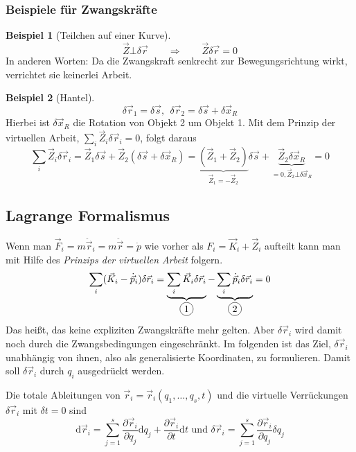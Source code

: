 \documentclass[oneside]{book}
\theoremstyle{definition}
\newtheorem*{beispiel*}{Beispiel}
\newcommand{\circled}[1]{\tikz[baseline=(char.base)]{
		\node[shape=circle,draw,inner sep=2pt] (char) {#1};}}
\renewcommand{\d}{\mathrm d}
\newcommand{\ddv}[1]{\ddot{\vec{#1}}}
\newcommand{\ddotvec}[1]{\ddot{\vec{#1}}}
\begin{document}
\subsubsection{Beispiele für Zwangskräfte}

\begin{beispiel*}[Teilchen auf einer Kurve]
$$\vec{Z} \bot \delta \vec{r} \qquad \Rightarrow \qquad \vec{Z} \delta \vec{r} = 0$$
In anderen Worten: Da die Zwangskraft senkrecht zur Bewegungsrichtung wirkt, verrichtet sie keinerlei Arbeit. 
\end{beispiel*}

\begin{beispiel*}[Hantel]
$$\delta \vec{r}_1 = \delta\vec{s},~~ \delta \vec{r}_2 = \delta \vec{s} + \delta \vec{x}_R$$
Hierbei ist $\delta \vec{x}_R$ die Rotation von Objekt 2 um Objekt 1.
Mit dem Prinzip der virtuellen Arbeit, $\sum_i \vec{Z}_i \delta \vec{r}_i = 0$, folgt daraus
$$\sum_i \vec Z_i \delta \vec{r}_i = \vec{Z}_1 \delta \vec{s} + \vec{Z}_2 (\delta \vec{s} + \delta \vec{x}_R) 
= \underbrace{(\vec{Z}_1 + \vec{Z}_2)}_{\vec{Z}_1 = - \vec{Z}_2} \delta \vec{s} + \underbrace{\vec{Z}_2 \delta \vec{x}_R}_{= 0, \vec{Z}_2 \bot \delta \vec{x}_R} = 0$$
\end{beispiel*}

\subsection{Lagrange Formalismus}
Wenn man $\vec{F}_i = m \ddotvec{r}_i = m \ddv{r} = \dot p$ wie vorher als $F_i = \vec{K}_i + \vec{Z}_i$ aufteilt kann man mit Hilfe des \textit{Prinzips der virtuellen Arbeit} folgern.
$$\sum_i (\vec{K}_i - \dot{\vec{p}}_i) \delta \vec{r}_i = \underbrace{\sum_i \vec{K}_i \delta\vec{r}_i}_{\circled{1}} - \underbrace{\sum_i \dot{\vec{p}}_i \delta\vec{r}_i}_{\circled{2}} = 0$$
Das heißt, das keine expliziten Zwangskräfte mehr gelten.
Aber $\delta \vec{r}_i$ wird damit noch durch die Zwangsbedingungen eingeschränkt. Im folgenden ist das Ziel, $\delta \vec{r}_i$ unabhängig von ihnen, also als generalisierte Koordinaten, zu formulieren. Damit soll $\delta \vec{r}_i$ durch $q_i$ ausgedrückt werden.

Die totale Ableitungen von $\vec{r}_i = \vec{r}_i(q_1, \dots, q_s, t)$ und die virtuelle Verrückungen $\delta \vec{r}_i$ mit $\delta t = 0$ sind
$$\d \vec{r}_i = \sum_{j = 1}^{s} \frac{\partial \vec{r}_i}{\partial q_j} \d q_j + \frac{\partial \vec{r}_i}{\partial t} \d t \text{~und~} \delta \vec{r}_i = \sum_{j = 1}^s \frac{\partial \vec{r}_i}{\partial q_j} \delta q_j$$
\end{document}
